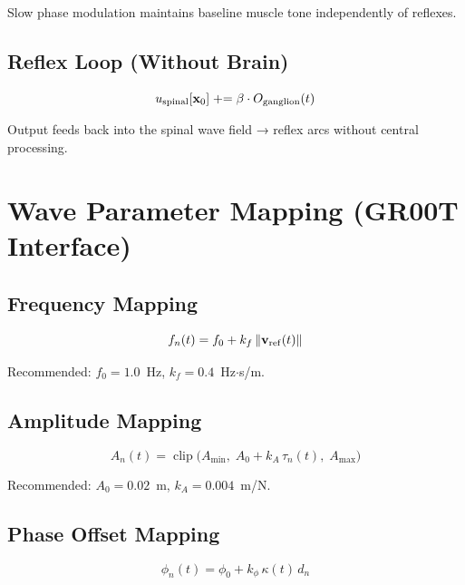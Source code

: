 \documentclass[12pt, a4paper]{article}
\begin{document}
Slow phase modulation maintains baseline muscle tone independently of reflexes.

\subsection{Reflex Loop (Without Brain)}

\begin{equation}\label{eq:reflex}
  u_{\rm spinal}[\mathbf{x}_0] \mathrel{+}= \beta \cdot O_{\rm ganglion}(t)
\end{equation}

Output feeds back into the spinal wave field → reflex arcs without central processing.

\section{Wave Parameter Mapping (GR00T Interface)}

\subsection{Frequency Mapping}

\begin{equation}\label{eq:freq_map}
  f_n(t) = f_0 + k_f\,\|\mathbf{v}_{\rm ref}(t)\|
\end{equation}

Recommended: $f_0 = 1.0$~Hz, $k_f = 0.4$~Hz$\cdot$s/m.

\subsection{Amplitude Mapping}

\begin{equation}\label{eq:amp_map}
  A_n(t) = \operatorname{clip}\!\bigl(A_{\min},\;
           A_0 + k_A\,\tau_n(t),\; A_{\max}\bigr)
\end{equation}

Recommended: $A_0 = 0.02$~m, $k_A = 0.004$~m/N.

\subsection{Phase Offset Mapping}

\begin{equation}\label{eq:phase_map}
  \phi_n(t) = \phi_0 + k_\phi\,\kappa(t)\,d_n
\end{equation}
\end{document}
